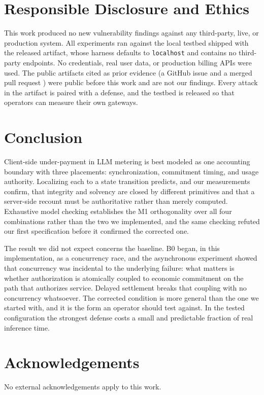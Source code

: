 \documentclass[preprint,3p,authoryear,12pt]{elsarticle}
\begin{document}
\section{Responsible Disclosure and Ethics}
This work produced no new vulnerability findings against any third-party, live, or
production system. All experiments ran against the local testbed shipped with the
released artifact, whose harness defaults to \texttt{localhost} and contains no
third-party endpoints. No credentials, real user data, or production billing APIs were
used. The public artifacts cited as prior evidence (a GitHub issue \citep{newapi5235}
and a merged pull request \citep{aperture247}) were public before this work and are
not our findings. Every attack in the artifact is paired with a defense, and the testbed
is released so that operators can measure their own gateways.

\section{Conclusion}
Client-side under-payment in LLM metering is best modeled as one accounting boundary
with three placements: synchronization, commitment timing, and usage authority.
Localizing each to a state transition predicts, and our measurements confirm, that
integrity and solvency are closed by different primitives and that a server-side recount
must be authoritative rather than merely computed. Exhaustive model checking establishes
the M1 orthogonality over all four combinations rather than the two we implemented, and
the same checking refuted our first specification before it confirmed the corrected one.

The result we did not expect concerns the baseline. B0 began, in this implementation, as
a concurrency race, and the asynchronous experiment showed that concurrency was
incidental to the underlying failure: what matters is whether authorization is
atomically coupled to economic commitment on the path that authorizes service. Delayed
settlement breaks that coupling with no concurrency whatsoever. The corrected condition
is more general than the one we started with, and it is the form an operator should test
against. In the tested configuration the strongest defense costs a small and predictable
fraction of real inference time.

\section*{Acknowledgements}
No external acknowledgements apply to this work.
\end{document}
